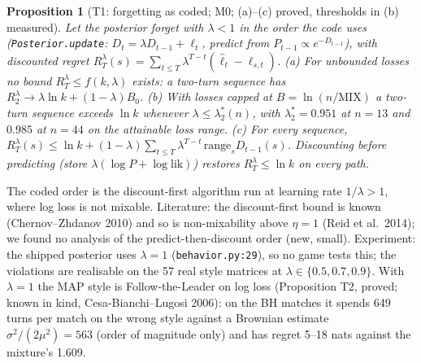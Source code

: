 \documentclass[10pt]{article}
\theoremstyle{plain}
\newtheorem{proposition}[theorem]{Proposition}
\theoremstyle{definition}
\theoremstyle{remark}
\begin{document}
\begin{proposition}[T1: forgetting as coded; M0; (a)--(c) proved, thresholds in (b) measured]\label{prop:T1}
Let the posterior forget with $\lambda<1$ in the order the code uses (\texttt{Posterior.update}: $D_t=\lambda D_{t-1}+\ell_t$,
predict from $P_{t-1}\propto e^{-D_{t-1}}$), with discounted regret $R^\lambda_T(s)=\sum_{t\le T}\lambda^{T-t}(\hat\ell_t-\ell_{s,t})$.
(a) For unbounded losses no bound $R^\lambda_T\le f(k,\lambda)$ exists: a two-turn sequence has
$R^\lambda_2\to\lambda\ln k+(1-\lambda)B_0$. (b) With losses capped at $B=\ln(n/\mathrm{MIX})$ a two-turn sequence exceeds
$\ln k$ whenever $\lambda\le\lambda^*_2(n)$, with $\lambda^*_2=0.951$ at $n=13$ and $0.985$ at $n=44$ on the attainable loss range.
(c) For every sequence, $R^\lambda_T(s)\le\ln k+(1-\lambda)\sum_{t\le T}\lambda^{T-t}\,\mathrm{range}_sD_{t-1}(s)$.
Discounting before predicting (store $\lambda(\log P+\log\mathrm{lik})$) restores $R^\lambda_T\le\ln k$ on every path.
\end{proposition}
The coded order is the discount-first algorithm run at learning rate $1/\lambda>1$, where log loss is not mixable.
Literature: the discount-first bound is known (Chernov--Zhdanov 2010) and so is non-mixability above $\eta=1$ (Reid et
al.\ 2014); we found no analysis of the predict-then-discount order (new, small). Experiment: the shipped posterior uses
$\lambda=1$ (\texttt{behavior.py:29}), so no game tests this; the violations are realisable on the 57 real style
matrices at $\lambda\in\{0.5,0.7,0.9\}$. With $\lambda=1$ the MAP style is Follow-the-Leader on log loss
(Proposition T2, proved; known in kind, Cesa-Bianchi--Lugosi 2006): on the BH matches it spends 649 turns per match
on the wrong style against a Brownian estimate $\sigma^2/(2\mu^2)=563$ (order of magnitude only) and has regret 5--18
nats against the mixture's 1.609.
\end{document}
